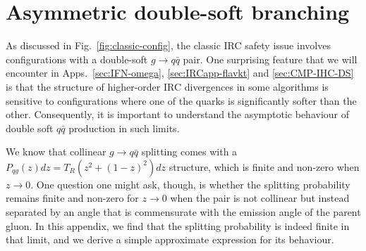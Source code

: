\documentclass[nofootinbib,twocolumn,preprintnumbers,superscriptaddress,aps]{revtex4-2}
\begin{document}

\appendix

\section{Asymmetric double-soft branching}
\label{sec:double-soft-structure}


As discussed in Fig.~\ref{fig:classic-config}, the classic IRC safety issue involves configurations with a double-soft $g \to q\bar q$ pair.
%
One surprising feature that we will encounter in
Apps.~\ref{sec:IFN-omega}, \ref{sec:IRCapp-flavkt}
and \ref{sec:CMP-IHC-DS}
is that the structure of higher-order IRC divergences in
some algorithms is sensitive to configurations where one of the quarks is significantly softer than the other.
%
Consequently, it is important to understand the asymptotic behaviour of
double soft $q\bar q$ production in such limits.


We know that collinear $g \to q\bar q$ splitting comes
with a $P_{qg}(z)dz = T_R (z^2 + (1-z)^2)dz$ structure, which is
finite and non-zero when $z \to 0$.
%
One question one might ask, though, is whether the splitting
probability remains finite and non-zero for $z \to 0$ when the pair is
not collinear but instead separated by an angle that is commensurate
with the emission angle of the parent gluon.
%
In this appendix, we find that the splitting probability is indeed finite in that limit, and we derive a simple approximate expression for its behaviour.
\end{document}
